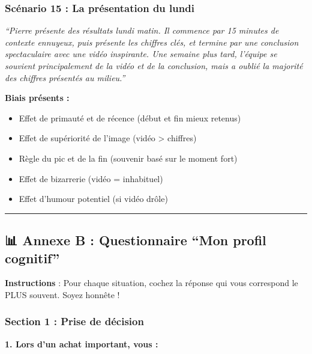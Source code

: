 \documentclass[
]{article}
\providecommand{\tightlist}{%
  \setlength{\itemsep}{0pt}\setlength{\parskip}{0pt}}
\begin{document}
\subsubsection{Scénario 15 : La présentation du
lundi}\label{scuxe9nario-15-la-pruxe9sentation-du-lundi}

\emph{``Pierre présente des résultats lundi matin. Il commence par 15
minutes de contexte ennuyeux, puis présente les chiffres clés, et
termine par une conclusion spectaculaire avec une vidéo inspirante. Une
semaine plus tard, l'équipe se souvient principalement de la vidéo et de
la conclusion, mais a oublié la majorité des chiffres présentés au
milieu.''}

\textbf{Biais présents :}

\begin{itemize}
\tightlist
\item
  Effet de primauté et de récence (début et fin mieux retenus)
\item
  Effet de supériorité de l'image (vidéo \textgreater{} chiffres)
\item
  Règle du pic et de la fin (souvenir basé sur le moment fort)
\item
  Effet de bizarrerie (vidéo = inhabituel)
\item
  Effet d'humour potentiel (si vidéo drôle)
\end{itemize}

\begin{center}\rule{0.5\linewidth}{0.5pt}\end{center}

\subsection{📊 Annexe B : Questionnaire ``Mon profil
cognitif''}\label{annexe-b-questionnaire-mon-profil-cognitif}

\textbf{Instructions} : Pour chaque situation, cochez la réponse qui
vous correspond le PLUS souvent. Soyez honnête !

\subsubsection{Section 1 : Prise de
décision}\label{section-1-prise-de-duxe9cision}

\textbf{1. Lors d'un achat important, vous :}
\end{document}
